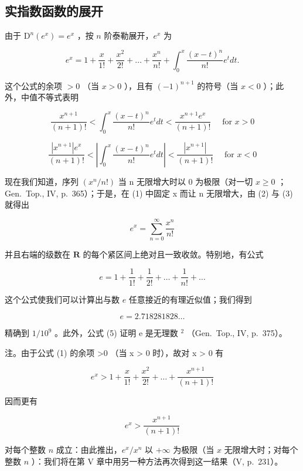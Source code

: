 \subsection{实指数函数的展开}

由于 \(\mathrm{D}^n (e^x) = e^x\) ，按 \(n\) 阶泰勒展开，\(e^x\) 为

\[
e ^ {x} = 1 + \frac {x}{1 !} + \frac {x ^ {2}}{2 !} + \dots + \frac {x ^ {n}}{n !} + \int_ {0} ^ {x} \frac {(x - t) ^ {n}}{n !} e ^ {t} d t.\tag{1}
\]

这个公式的余项 \(>0\) （当 \(x > 0\) ），且有 \((-1)^{n + 1}\) 的符号（当 \(x < 0\) ）；此外，中值不等式表明

\[
\frac {x ^ {n + 1}}{(n + 1) !} <   \int_ {0} ^ {x} \frac {(x - t) ^ {n}}{n !} e ^ {t} d t <   \frac {x ^ {n + 1} e ^ {x}}{(n + 1) !} \quad \text { for } x > 0\tag{2}
\]

\[
\frac {\left| x ^ {n + 1} \right| e ^ {x}}{(n + 1) !} <   \left| \int_ {0} ^ {x} \frac {(x - t) ^ {n}}{n !} e ^ {t} d t \right| <   \frac {\left| x ^ {n + 1} \right|}{(n + 1) !} \quad \text { for } x <   0\tag{3}
\]

现在我们知道，序列 \((x^{n}/n!)\) 当 n 无限增大时以 0 为极限（对一切 \(x \geqslant 0\) ；Gen.~Top., IV, p.~365）；于是，在 (1) 中固定 x 而让 n 无限增大，由 (2) 与 (3) 就得出

\[
e ^ {x} = \sum_ {n = 0} ^ {\infty} \frac {x ^ {n}}{n !}\tag{4}
\]

并且右端的级数在 \(\mathbf{R}\) 的每个紧区间上绝对且一致收敛。特别地，有公式

\[
e = 1 + \frac {1}{1 !} + \frac {1}{2 !} + \dots + \frac {1}{n !} + \dots\tag{5}
\]

这个公式使我们可以计算出与数 \(e\) 任意接近的有理近似值；我们得到

\[
e = 2. 7 1 8   2 8 1   8 2 8 \dots
\]

精确到 \(1/10^{9}\) 。此外，公式 (5) 证明 e 是无理数 \(^{2}\) （Gen.~Top., IV, p.~375）。

注。由于公式 (1) 的余项 \textgreater0 （当 x \textgreater{} 0 时），故对 x \textgreater{} 0 有

\[
e ^ {x} > 1 + \frac {x}{1 !} + \frac {x ^ {2}}{2 !} + \dots + \frac {x ^ {n + 1}}{(n + 1) !}
\]

因而更有

\[
e ^ {x} > \frac {x ^ {n + 1}}{(n + 1) !}
\]

对每个整数 \(n\) 成立：由此推出，\(e^x / x^n\) 以 \(+\infty\) 为极限（当 \(x\) 无限增大时；对每个整数 \(n\) ）：我们将在第 V 章中用另一种方法再次得到这一结果（V, p.~231）。

